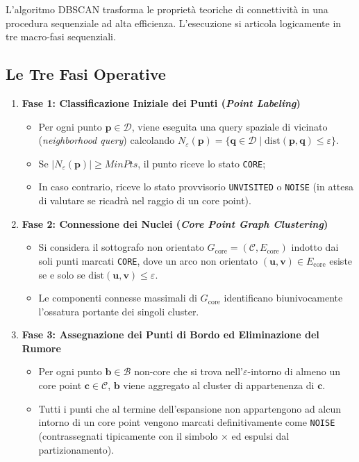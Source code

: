 L'algoritmo DBSCAN trasforma le proprietà teoriche di connettività in una procedura sequenziale ad alta efficienza. L'esecuzione si articola logicamente in tre macro-fasi sequenziali.

\FloatBarrier
\subsection{Le Tre Fasi Operative}

\begin{enumerate}
    \item \textbf{Fase 1: Classificazione Iniziale dei Punti (\textit{Point Labeling})}
    \begin{itemize}[noitemsep]
        \item Per ogni punto $\mathbf{p} \in \mathcal{D}$, viene eseguita una query spaziale di vicinato (\textit{neighborhood query}) calcolando $N_\varepsilon(\mathbf{p}) = \{\mathbf{q} \in \mathcal{D} \mid \mathrm{dist}(\mathbf{p}, \mathbf{q}) \le \varepsilon\}$.
        \item Se $|N_\varepsilon(\mathbf{p})| \ge MinPts$, il punto riceve lo stato \texttt{CORE};
        \item In caso contrario, riceve lo stato provvisorio \texttt{UNVISITED} o \texttt{NOISE} (in attesa di valutare se ricadrà nel raggio di un core point).
    \end{itemize}

    \item \textbf{Fase 2: Connessione dei Nuclei (\textit{Core Point Graph Clustering})}
    \begin{itemize}[noitemsep]
        \item Si considera il sottografo non orientato $G_{\mathrm{core}} = (\mathcal{C}, E_{\mathrm{core}})$ indotto dai soli punti marcati \texttt{CORE}, dove un arco non orientato $(\mathbf{u}, \mathbf{v}) \in E_{\mathrm{core}}$ esiste se e solo se $\mathrm{dist}(\mathbf{u}, \mathbf{v}) \le \varepsilon$.
        \item Le componenti connesse massimali di $G_{\mathrm{core}}$ identificano biunivocamente l'ossatura portante dei singoli cluster.
    \end{itemize}

    \item \textbf{Fase 3: Assegnazione dei Punti di Bordo ed Eliminazione del Rumore}
    \begin{itemize}[noitemsep]
        \item Per ogni punto $\mathbf{b} \in \mathcal{B}$ non-core che si trova nell'$\varepsilon$-intorno di almeno un core point $\mathbf{c} \in \mathcal{C}$, $\mathbf{b}$ viene aggregato al cluster di appartenenza di $\mathbf{c}$.
        \item Tutti i punti che al termine dell'espansione non appartengono ad alcun intorno di un core point vengono marcati definitivamente come \texttt{NOISE} (contrassegnati tipicamente con il simbolo $\times$ ed espulsi dal partizionamento).
    \end{itemize}
\end{enumerate}


